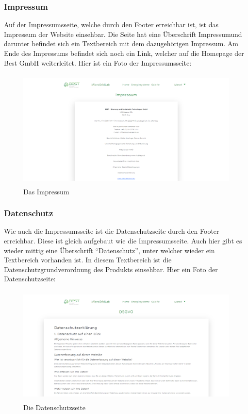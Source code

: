 \subsubsection{Impressum}
Auf der Impressumsseite, welche durch den Footer erreichbar ist, ist das Impressum der Website einsehbar. Die Seite hat eine Überschrift  \glqq Impressum\grqq \space und darunter befindet sich ein Textbereich  mit dem dazugehörigen Impressum. Am Ende des Impressums befindet sich noch ein Link, welcher auf die Homepage der Best GmbH weiterleitet. Hier ist ein Foto der Impressumsseite:

\begin{figure}[h]
	\centering
	\includegraphics[height=6cm,width=14cm]{images/ImpressumSeite}
	\caption{Das Impressum}
	\label{fig:Impressum}
\end{figure}

\subsubsection{Datenschutz}
Wie auch die Impressumsseite ist die Datenschutzseite durch den Footer erreichbar. Diese ist gleich aufgebaut wie die Impressumsseite. Auch hier gibt es wieder mittig eine Überschrift “Datenschutz”, unter welcher wieder ein Textbereich vorhanden ist. In diesem Textbereich  ist die Datenschutzgrundverordnung des Produkts einsehbar.  Hier ein Foto der Datenschutzseite:
\begin{figure}[h]
	\centering
	\includegraphics[height=6cm,width=14cm]{images/DSGVOSeite}
	\caption{Die Datenschutzseite}
	\label{fig:DSGVO}
\end{figure}
